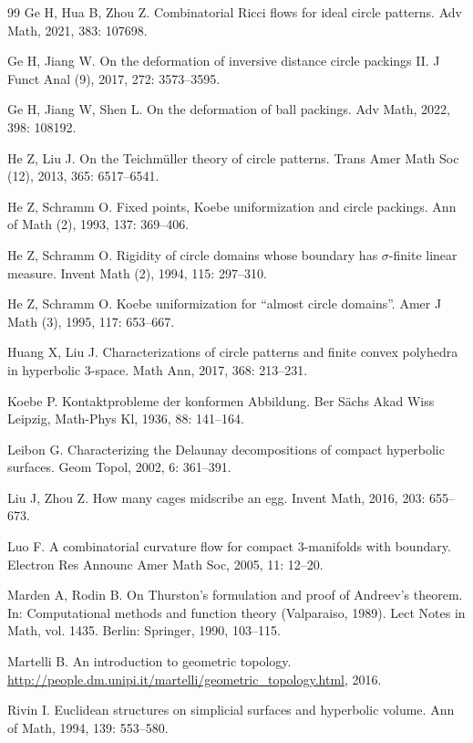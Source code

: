 \documentclass[12pt]{amsart}
\numberwithin{equation}{section}
\begin{document}
\begin{thebibliography}{99}
 Ge H, Hua B, Zhou Z. Combinatorial Ricci flows for ideal circle patterns. Adv Math, 2021, 383: 107698.

 Ge H, Jiang W. On the deformation of inversive distance circle packings II. J Funct Anal (9), 2017, 272: 3573--3595.

 Ge H, Jiang W, Shen L. On the deformation of ball packings. Adv Math, 2022, 398: 108192.

 He Z, Liu J. On the Teichm\"uller theory of circle patterns. Trans Amer Math Soc (12), 2013, 365: 6517--6541.

 He Z, Schramm O. Fixed points, Koebe uniformization and circle packings. Ann of Math (2), 1993, 137: 369--406.

 He Z, Schramm O. Rigidity of circle domains whose boundary has $\sigma$-finite linear measure. Invent Math (2), 1994, 115: 297--310.

 He Z, Schramm O. Koebe uniformization for ``almost circle domains''. Amer J Math (3), 1995, 117: 653--667.

 Huang X, Liu J. Characterizations of circle patterns and finite convex polyhedra in hyperbolic 3-space. Math Ann, 2017, 368: 213--231.

 Koebe P. Kontaktprobleme der konformen Abbildung. Ber S\"achs Akad Wiss Leipzig, Math-Phys Kl, 1936, 88: 141--164.

 Leibon G. Characterizing the Delaunay decompositions of compact hyperbolic surfaces. Geom Topol, 2002, 6: 361--391.

 Liu J, Zhou Z. How many cages midscribe an egg. Invent Math, 2016, 203: 655--673.

 Luo F. A combinatorial curvature flow for compact 3-manifolds with boundary. Electron Res Announc Amer Math Soc, 2005, 11: 12--20.

 Marden A, Rodin B. On Thurston's formulation and proof of Andreev's theorem. In: Computational methods and function theory (Valparaiso, 1989). Lect Notes in Math, vol. 1435. Berlin: Springer, 1990, 103--115.

 Martelli B. An introduction to geometric topology. \url{http://people.dm.unipi.it/martelli/geometric_topology.html}, 2016.

 Rivin I. Euclidean structures on simplicial surfaces and hyperbolic volume. Ann of Math, 1994, 139: 553--580.


\end{thebibliography}
\end{document}

